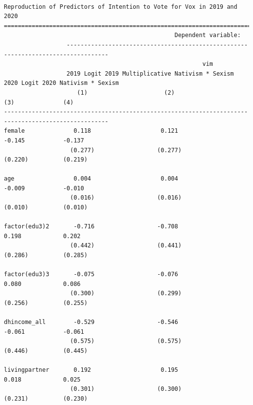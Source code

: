 \documentclass[
  letterpaper,
  DIV=11,
  numbers=noendperiod]{scrartcl}
\begin{document}
\begin{verbatim}

Reproduction of Predictors of Intention to Vote for Vox in 2019 and 2020
====================================================================================================
                                                 Dependent variable:                                
                  ----------------------------------------------------------------------------------
                                                         vim                                        
                  2019 Logit 2019 Multiplicative Nativism * Sexism 2020 Logit 2020 Nativism * Sexism
                     (1)                      (2)                     (3)              (4)          
----------------------------------------------------------------------------------------------------
female              0.118                    0.121                   -0.145           -0.137        
                   (0.277)                  (0.277)                 (0.220)          (0.219)        
                                                                                                    
age                 0.004                    0.004                   -0.009           -0.010        
                   (0.016)                  (0.016)                 (0.010)          (0.010)        
                                                                                                    
factor(edu3)2       -0.716                  -0.708                   0.198            0.202         
                   (0.442)                  (0.441)                 (0.286)          (0.285)        
                                                                                                    
factor(edu3)3       -0.075                  -0.076                   0.080            0.086         
                   (0.300)                  (0.299)                 (0.256)          (0.255)        
                                                                                                    
dhincome_all        -0.529                  -0.546                   -0.061           -0.061        
                   (0.575)                  (0.575)                 (0.446)          (0.445)        
                                                                                                    
livingpartner       0.192                    0.195                   0.018            0.025         
                   (0.301)                  (0.300)                 (0.231)          (0.230)        
                                                                                                    

\end{verbatim}
\end{document}
